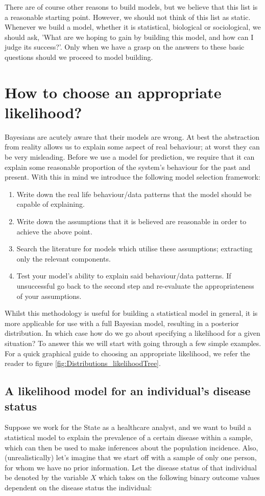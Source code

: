 \documentclass[11pt,fullpage]{book}
\begin{document}
There are of course other reasons to build models, but we believe that this list is a reasonable starting point. However, we should not think of this list as static. Whenever we build a model, whether it is statistical, biological or sociological, we should ask, 'What are we hoping to gain by building this model, and how can I judge its success?'. Only when we have a grasp on the answers to these basic questions should we proceed to model building.

\section{How to choose an appropriate likelihood?}\label{sec:chooseLikelihood}
Bayesians are acutely aware that their models are wrong. At best the abstraction from reality allows us to explain some aspect of real behaviour; at worst they can be very misleading. Before we use a model for prediction, we require that it can explain some reasonable proportion of the system's behaviour for the past and present. With this in mind we introduce the following model selection framework:

\begin{enumerate}
\item Write down the real life behaviour/data patterns that the model should be capable of explaining.
\item Write down the assumptions that it is believed are reasonable in order to achieve the above point.
\item Search the literature for models which utilise these assumptions; extracting only the relevant components.
\item Test your model's ability to explain said behaviour/data patterns. If unsuccessful go back to the second step and re-evaluate the appropriateness of your assumptions.
\end{enumerate}

Whilst this methodology is useful for building a statistical model in general, it is more applicable for use with a full Bayesian model, resulting in a posterior distribution. In which case how do we go about specifying a likelihood for a given situation? To answer this we will start with going through a few simple examples. For a quick graphical guide to choosing an appropriate likelihood, we refer the reader to figure \ref{fig:Distributions_likelihoodTree}.

\subsection{A likelihood model for an individual's disease status}\label{sec:Likelihood_individualDisease}
Suppose we work for the State as a healthcare analyst, and we want to build a statistical model to explain the prevalence of a certain disease within a sample, which can then be used to make inferences about the population incidence. Also, (unrealistically) let's imagine that we start off with a sample of only one person, for whom we have no prior information. Let the disease status of that individual be denoted by the variable $X$ which takes on the following binary outcome values dependent on the disease status the individual:
\end{document}
